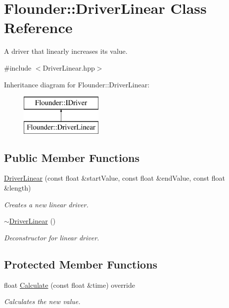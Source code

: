 \hypertarget{class_flounder_1_1_driver_linear}{}\section{Flounder\+:\+:Driver\+Linear Class Reference}
\label{class_flounder_1_1_driver_linear}


A driver that linearly increases its value.  




{\ttfamily \#include $<$Driver\+Linear.\+hpp$>$}

Inheritance diagram for Flounder\+:\+:Driver\+Linear\+:\begin{figure}[H]
\begin{center}
\leavevmode
\includegraphics[height=2.000000cm]{class_flounder_1_1_driver_linear}
\end{center}
\end{figure}
\subsection*{Public Member Functions}
\begin{DoxyCompactItemize}
\item 
\hyperlink{class_flounder_1_1_driver_linear_a54d17ab52c0e85294f40046bc1a2993f}{Driver\+Linear} (const float \&start\+Value, const float \&end\+Value, const float \&length)
\begin{DoxyCompactList}\small\item\em Creates a new linear driver. \end{DoxyCompactList}\item 
\hyperlink{class_flounder_1_1_driver_linear_a9cdb78bcb4207311c693c60d6aee63e0}{$\sim$\+Driver\+Linear} ()
\begin{DoxyCompactList}\small\item\em Deconstructor for linear driver. \end{DoxyCompactList}\end{DoxyCompactItemize}
\subsection*{Protected Member Functions}
\begin{DoxyCompactItemize}
\item 
float \hyperlink{class_flounder_1_1_driver_linear_adbe67b982e8b7a819ec613a83617d83b}{Calculate} (const float \&time) override
\begin{DoxyCompactList}\small\item\em Calculates the new value. \end{DoxyCompactList}\end{DoxyCompactItemize}
